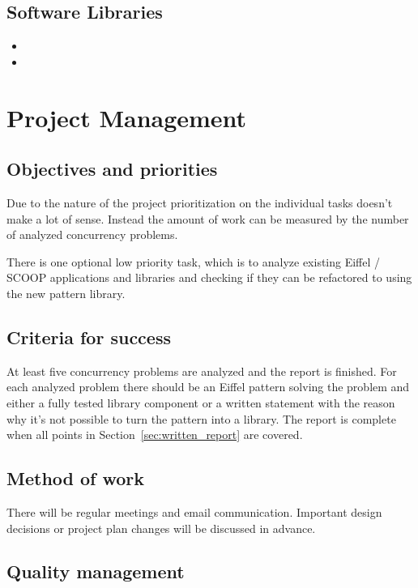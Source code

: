 \documentclass[a4paper,10pt]{article}
\begin{document}
\subsection {Software Libraries}
\begin{flushleft}
\begin {itemize}
\item {}
\item {}
\end{itemize}
\end{flushleft}

\section {Project Management}
\label {sec:project-management}

\subsection{Objectives and priorities}

Due to the nature of the project prioritization on the individual tasks doesn’t make a lot of sense. Instead the amount of work can be measured by the number of analyzed concurrency problems. 

There is one optional low priority task, which is to analyze existing Eiffel / SCOOP applications and libraries and checking if they can be refactored to using the new pattern library.
\subsection {Criteria for success}
At least five concurrency problems are analyzed and the report is finished. For each analyzed problem there should be an Eiffel pattern solving the problem and either a fully tested library component or a written statement with the reason why it’s not possible to turn the pattern into a library. The report is complete when all points in Section~\ref{sec:written_report} are covered.
\subsection {Method of work}
There will be regular meetings and email communication. Important design decisions or project plan changes will be discussed in advance.

\subsection {Quality management}
\end{document}
